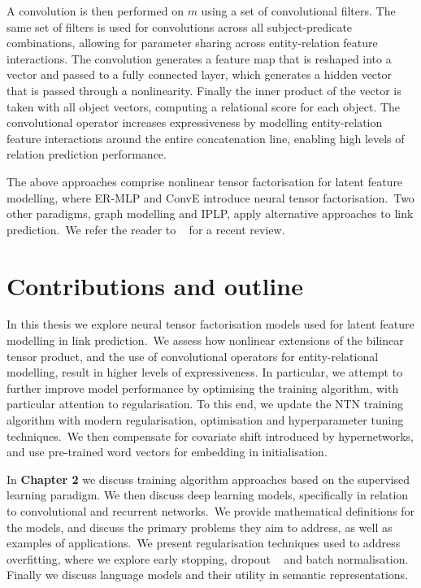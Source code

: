 \noindent A convolution is then performed on $ m $ using a set of convolutional filters. The same set of filters is used for convolutions across all subject-predicate combinations, allowing for parameter sharing across entity-relation feature interactions. The convolution generates a feature map that is reshaped into a vector and passed to a fully connected layer, which generates a hidden vector that is passed through a nonlinearity. Finally the inner product of the vector is taken with all object vectors, computing a relational score for each object. The convolutional operator increases expressiveness by modelling entity-relation feature interactions around the entire concatenation line, enabling high levels of relation prediction performance. \par

\noindent The above approaches comprise nonlinear tensor factorisation for latent feature modelling, where ER-MLP and ConvE introduce neural tensor factorisation.\ Two other paradigms, graph modelling and IPLP, apply alternative approaches to link prediction.\ We refer the reader to \unskip~\citep{nickel2015review} for a recent review. \par



\section{Contributions and outline} %

\noindent In this thesis we explore neural tensor factorisation models used for latent feature modelling in link prediction.\ We assess how nonlinear extensions of the bilinear tensor product, and the use of convolutional operators for entity-relational modelling, result in higher levels of expressiveness. In particular, we attempt to further improve model performance by optimising the training algorithm, with particular attention to regularisation. To this end, we update the NTN training algorithm with modern regularisation, optimisation and hyperparameter tuning techniques.\ We then compensate for covariate shift introduced by hypernetworks, and use pre-trained word vectors for embedding in initialisation. \par

\noindent In \textbf{Chapter 2} we discuss training algorithm approaches based on the supervised learning paradigm. We then discuss deep learning models, specifically in relation to convolutional and recurrent networks.\ We provide mathematical definitions for the models, and discuss the primary problems they aim to address, as well as examples of applications.\ We present regularisation techniques used to address overfitting, where we explore early stopping, dropout \unskip ~\citep{srivastava2014dropout} and batch normalisation. Finally we discuss language models and their utility in semantic representations. \par

